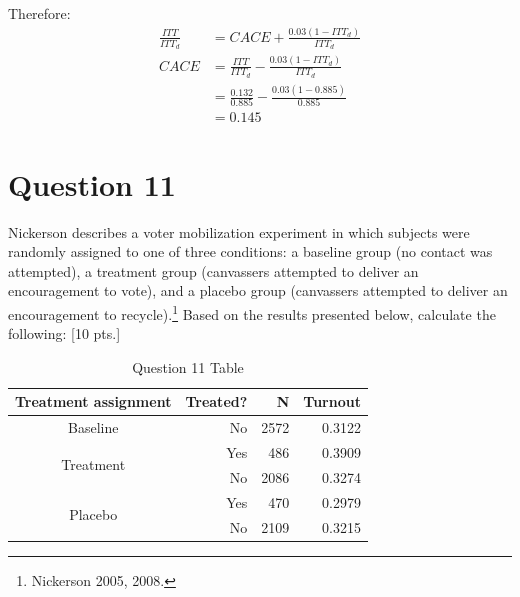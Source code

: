 \documentclass[11pt,notitlepage]{article}\usepackage[]{graphicx}\usepackage[]{color}
\begin{document}
\begin{enumerate}[a)]
Therefore:
\begin{align*}
\frac{ITT}{ITT_d} &= CACE + \frac{0.03(1-ITT_d)}{ITT_d}\\
CACE &= \frac{ITT}{ITT_d} - \frac{0.03(1-ITT_d)}{ITT_d}\\
&= \frac{0.132}{0.885} - \frac{0.03(1-0.885)}{0.885}\\
&= 0.145
\end{align*}



\end{enumerate}

\section*{Question 11}
Nickerson describes a voter mobilization experiment in which subjects were randomly assigned to one of three conditions: a baseline group (no contact was attempted), a treatment group (canvassers attempted to deliver an encouragement to vote), and a placebo group (canvassers attempted to deliver an encouragement to recycle).\footnote{Nickerson 2005, 2008.} Based on the results presented below, calculate the following: [10 pts.]
\begin{table}[H]
  \centering
  \caption{Question 11 Table}
    \begin{tabular}{rrrr}
    \toprule
    Treatment assignment  & Treated?  & N     & Turnout  \\
    \midrule
    \multicolumn{1}{c}{Baseline}  & No    & 2572  & 0.3122 \\
    \multicolumn{1}{c}{\multirow{2}[0]{*}{Treatment }} & Yes   & 486   & 0.3909 \\
    \multicolumn{1}{c}{} & No    & 2086  & 0.3274 \\
    \multicolumn{1}{c}{\multirow{2}[0]{*}{Placebo }} & Yes   & 470   & 0.2979 \\
    \multicolumn{1}{c}{} & No    & 2109  & 0.3215 \\
    \bottomrule
    \end{tabular}%
  \label{tab:addlabel}%
\end{table}%
\end{document}
